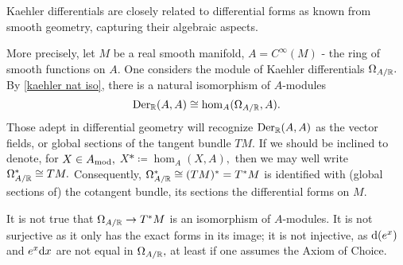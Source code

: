 \begin{note}
  Kaehler differentials are closely related to differential forms as known from smooth geometry, capturing their algebraic aspects.

  More precisely, let \(M\) be a real smooth manifold, \(A = C^\infty(M)\) - the ring of smooth functions on \(A.\) One considers the module of Kaehler differentials \(\Omega_{A/{\mathbb R}}.\) By \cref{kaehler nat iso}, there is a natural isomorphism of \(A\)-modules
  \[\operatorname{Der}_\mathbb R(A, A) \cong \hom_A(\Omega_{A/{\mathbb R}}, A).\]
  Those adept in differential geometry will recognize \(\operatorname{Der}_\mathbb R(A, A)\) as the vector fields, or global sections of the tangent bundle \(TM.\) If we should be inclined to denote, for \(X \in {A}_\mathrm{mod},\) \(X* \coloneqq \hom_A(X, A),\) then we may well write \(\Omega_{A/{\mathbb R}}^{*} \cong TM.\)
  Consequently, \(\Omega_{A/{\mathbb R}}^* \cong (TM)^* = T^*M\) is identified with (global sections of) the cotangent bundle, its sections the differential forms on \(M.\)

  It is not true that \(\Omega_{A/{\mathbb R}} \to T^*M\) is an isomorphism of \(A\)-modules. It is not surjective as it only has the exact forms in its image; it is not injective, as \(\text{d}(e^x)\) and \(e^x \text{d} x\) are not equal in \(\Omega_{A/{\mathbb R}},\) at least if one assumes the Axiom of Choice. \cite{MO}
\end{note}













